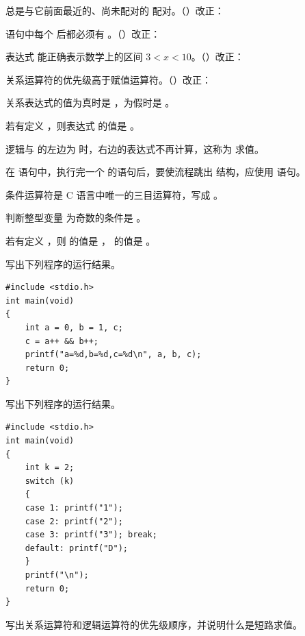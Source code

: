 \documentclass[a4paper,11pt]{article}
\begin{document}
\q {} 总是与它前面最近的、尚未配对的  配对。\quad（\quad）\quad 改正：\fixblank

\q {} 语句中每个  后都必须有 。\quad（\quad）\quad 改正：\fixblank

\q 表达式  能正确表示数学上的区间 $3<x<10$。\quad（\quad）\quad 改正：\fixblank

\q 关系运算符的优先级高于赋值运算符。\quad（\quad）\quad 改正：\fixblank


\q 关系表达式的值为真时是 \fillblank{}，为假时是 \fillblank{}。

\q 若有定义 ，则表达式  的值是 \fillblank{}。

\q 逻辑与 \code{\&\&} 的左边为 \fillblank{} 时，右边的表达式不再计算，这称为 \fillblank{} 求值。

\q 在  语句中，执行完一个  的语句后，要使流程跳出  结构，应使用 \fillblank{} 语句。

\q 条件运算符是 C 语言中唯一的三目运算符，写成 \fillblank{}。

\q 判断整型变量  为奇数的条件是 \fillblank{}。

\q 若有定义 ，则  的值是 \fillblank{}， 的值是 \fillblank{}。


\q 写出下列程序的运行结果。
\begin{lstlisting}[language={[custom]C}]
#include <stdio.h>
int main(void)
{
    int a = 0, b = 1, c;
    c = a++ && b++;
    printf("a=%d,b=%d,c=%d\n", a, b, c);
    return 0;
}
\end{lstlisting}
\anslines{2.4cm}

\q 写出下列程序的运行结果。
\begin{lstlisting}[language={[custom]C}]
#include <stdio.h>
int main(void)
{
    int k = 2;
    switch (k)
    {
    case 1: printf("1");
    case 2: printf("2");
    case 3: printf("3"); break;
    default: printf("D");
    }
    printf("\n");
    return 0;
}
\end{lstlisting}
\anslines{2.4cm}


\q 写出关系运算符和逻辑运算符的优先级顺序，并说明什么是短路求值。\anslines{3.2cm}
\end{document}
